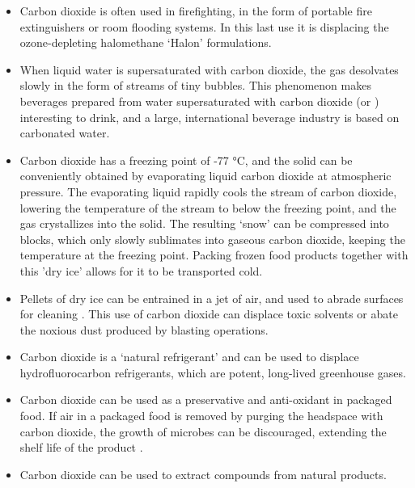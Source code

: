\begin{itemize}
  
  \item Carbon dioxide is often used in firefighting, in the form of portable
  fire extinguishers or room flooding systems. In this last use it is displacing
  the ozone-depleting halomethane `Halon' formulations.
  
  \item When liquid water is supersaturated with carbon dioxide, the gas
  desolvates slowly in the form of streams of tiny bubbles. This phenomenon
  makes beverages prepared from water supersaturated with carbon dioxide (or
  ) interesting to drink, and a large, international
  beverage industry is based on carbonated water.
   
   \item Carbon dioxide has a freezing point of {-}77 °C, and the solid can be
   conveniently obtained by evaporating liquid carbon dioxide at atmospheric
   pressure. The evaporating liquid rapidly cools the stream of carbon dioxide,
   lowering the temperature of the stream to below the freezing point, and the
   gas crystallizes into the solid. The resulting `snow' can be compressed into
   blocks, which only slowly sublimates into gaseous carbon dioxide, keeping the
   temperature at the freezing point. Packing frozen food products together with
   this 'dry ice' allows for it to be transported cold.
   
   \item Pellets of dry ice can be entrained in a jet of air, and used to abrade
   surfaces for cleaning \autocite{Spur1999}. This use of carbon dioxide can
   displace toxic solvents or abate the noxious dust produced by blasting operations.
   
   \item Carbon dioxide is a `natural refrigerant' \autocite{Pearson2005} and
   can be used to displace hydrofluorocarbon refrigerants, which are potent,
   long-lived greenhouse gases.
   
   \item Carbon dioxide can be used as a preservative and anti-oxidant in
   packaged food. If air in a packaged food is removed by purging the headspace
   with carbon dioxide, the growth of microbes can be discouraged, extending the
   shelf life of the product \autocite{Jacobsen2002}.
	   
	\item Carbon dioxide can be used to extract compounds from natural products. 
	
\end{itemize}

